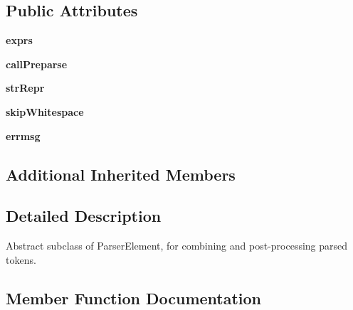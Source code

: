 \subsection*{Public Attributes}
\begin{DoxyCompactItemize}
\item 
\mbox{\label{classsetuptools_1_1__vendor_1_1pyparsing_1_1_parse_expression_a4e2611e5f2c7118fb18cdc4a710bd3db}} 
{\bfseries exprs}
\item 
\mbox{\label{classsetuptools_1_1__vendor_1_1pyparsing_1_1_parse_expression_a66ce3bbb428462ec20ce5b4280f067fe}} 
{\bfseries call\+Preparse}
\item 
\mbox{\label{classsetuptools_1_1__vendor_1_1pyparsing_1_1_parse_expression_a167620f1d1a41f57c779b877765a3c35}} 
{\bfseries str\+Repr}
\item 
\mbox{\label{classsetuptools_1_1__vendor_1_1pyparsing_1_1_parse_expression_a41c4841532e05e52578a9db2533f18f1}} 
{\bfseries skip\+Whitespace}
\item 
\mbox{\label{classsetuptools_1_1__vendor_1_1pyparsing_1_1_parse_expression_afa1df56aa11b4bd94e10b3f1770867f6}} 
{\bfseries errmsg}
\end{DoxyCompactItemize}
\subsection*{Additional Inherited Members}


\subsection{Detailed Description}
\begin{DoxyVerb}Abstract subclass of ParserElement, for combining and post-processing parsed tokens.
\end{DoxyVerb}
 

\subsection{Member Function Documentation}
\mbox{\label{classsetuptools_1_1__vendor_1_1pyparsing_1_1_parse_expression_a69c2da4772c362e6312fda61129a50a5}} 
